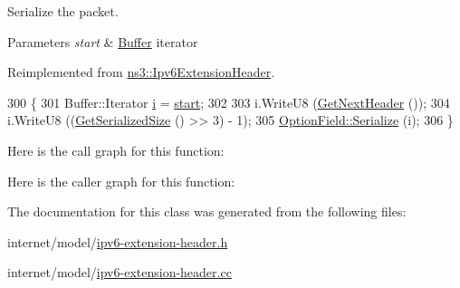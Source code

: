 Serialize the packet. 


\begin{DoxyParams}{Parameters}
{\em start} & \hyperlink{classns3_1_1Buffer}{Buffer} iterator \\
\hline
\end{DoxyParams}


Reimplemented from \hyperlink{classns3_1_1Ipv6ExtensionHeader_a98bce1a4ea1265b45c480eed63dc2893}{ns3\+::\+Ipv6\+Extension\+Header}.


\begin{DoxyCode}
300 \{
301   Buffer::Iterator \hyperlink{bernuolliDistribution_8m_a6f6ccfcf58b31cb6412107d9d5281426}{i} = \hyperlink{namespacevisualizer_1_1core_a2a35e5d8a34af358b508dac8635754e0}{start};
302 
303   i.WriteU8 (\hyperlink{classns3_1_1Ipv6ExtensionHeader_a8bcd0646a2fe4c335270fc1d9d336324}{GetNextHeader} ());
304   i.WriteU8 ((\hyperlink{classns3_1_1Ipv6ExtensionDestinationHeader_a4a43146a75ea4259b984df145c573146}{GetSerializedSize} () >> 3) - 1);
305   \hyperlink{classns3_1_1OptionField_a9cd4cd7b17a7e443a17dcfcfadef4c28}{OptionField::Serialize} (i);
306 \}
\end{DoxyCode}


Here is the call graph for this function\+:




Here is the caller graph for this function\+:




The documentation for this class was generated from the following files\+:\begin{DoxyCompactItemize}
\item 
internet/model/\hyperlink{ipv6-extension-header_8h}{ipv6-\/extension-\/header.\+h}\item 
internet/model/\hyperlink{ipv6-extension-header_8cc}{ipv6-\/extension-\/header.\+cc}\end{DoxyCompactItemize}
